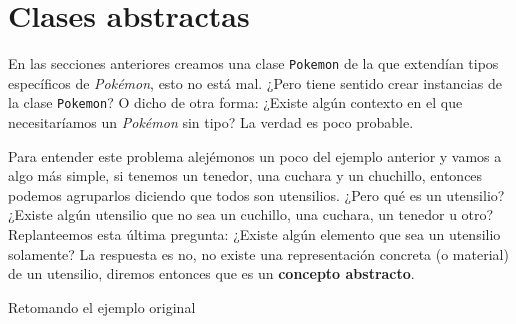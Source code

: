\section{Clases abstractas}
  En las secciones anteriores creamos una clase \texttt{Pokemon} de la que extendían tipos 
  específicos de \textit{Pokémon}, esto no está mal.
  ¿Pero tiene sentido crear instancias de la clase \texttt{Pokemon}?
  O dicho de otra forma: ¿Existe algún contexto en el que necesitaríamos un \textit{Pokémon} sin 
  tipo?
  La verdad es poco probable.

  Para entender este problema alejémonos un poco del ejemplo anterior y vamos a algo más simple, si
  tenemos un tenedor, una cuchara y un chuchillo, entonces podemos agruparlos diciendo que todos son 
  utensilios.
  ¿Pero qué es un utensilio?
  ¿Existe algún utensilio que no sea un cuchillo, una cuchara, un tenedor u otro?
  Replanteemos esta última pregunta: ¿Existe algún elemento que sea un utensilio solamente?
  La respuesta es no, no existe una representación concreta (o material) de un utensilio, diremos
  entonces que es un \textbf{concepto abstracto}.

  Retomando el ejemplo original
%